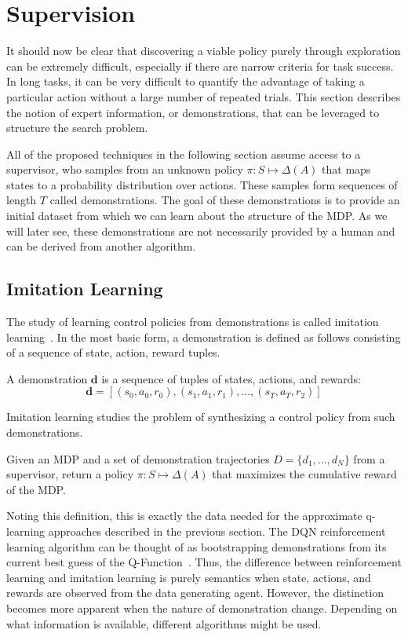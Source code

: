 \section{Supervision}
It should now be clear that discovering a viable policy purely through exploration can be extremely difficult, especially if there are narrow criteria for task success.
In long tasks, it can be very difficult to quantify the advantage of taking a particular action without a large number of repeated trials. This section describes the notion of expert information, or demonstrations, that can be leveraged to structure the search problem.

All of the proposed techniques in the following section assume access to a supervisor, who samples from an unknown policy $\pi: S \mapsto \Delta(A)$ that maps states to a probability distribution over actions. These samples form sequences of length $T$ called demonstrations. 
The goal of these demonstrations is to provide an initial dataset from which we can learn about the structure of the MDP. As we will later see, these demonstrations are not necessarily provided by a human and can be derived from another algorithm.

\subsection{Imitation Learning}
The study of learning control policies from demonstrations is called imitation learning~\cite{osa2018algorithmic}. In the most basic form, a demonstration is defined as follows consisting of a sequence of state, action, reward tuples. 

\begin{definition}[Demonstration]
A demonstration $\mathbf{d}$ is a sequence of tuples of states, actions, and rewards:
\[\mathbf{d} = [(s_0,a_0,r_0),(s_1,a_1,r_1),...,(s_T,a_T,r_2)]\]
\end{definition}

Imitation learning studies the problem of synthesizing a control policy from such demonstrations.

\begin{problem}
Given an MDP and a set of demonstration trajectories $D = \{d_1,...,d_N\}$ from a supervisor, return a policy $\pi: S \mapsto \Delta(A)$ that maximizes the cumulative reward of the MDP.
\end{problem}

Noting this definition, this is exactly the data needed for the approximate q-learning approaches described in the previous section.
The DQN reinforcement learning algorithm can be thought of as bootstrapping demonstrations from its current best guess of the Q-Function~\cite{mnih2015human}. Thus, the difference between reinforcement learning and imitation learning is purely semantics when state, actions, and rewards are observed from the data generating agent. However, the distinction becomes more apparent when the nature of demonstration change. Depending on what information is available, different algorithms might be used. 

